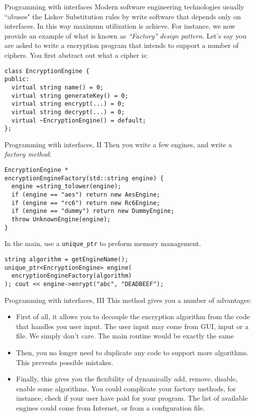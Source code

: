 \begin{frame}[fragile]{Programming with interfaces}
Modern software engineering technologies usually ``abuses" the Liskov Substitution rules by write software that depends only on interfaces. In this way maximum utilization is achieve. For instance, we now provide an example of what is known as \textit{``Factory" design pattern}. Let's say you are asked to write a encryption program that intends to support a number of ciphers. You first abstract out what a cipher is:

\begin{verbatim}
class EncryptionEngine {
public:
  virtual string name() = 0;
  virtual string generateKey() = 0;
  virtual string encrypt(...) = 0;
  virtual string decrypt(...) = 0;
  virtual ~EncryptionEngine() = default;
};
\end{verbatim}
\end{frame}

\begin{frame}[fragile]{Programming with interfaces, II}
Then you write a few engines, and write a \textit{factory method}:
\begin{verbatim}
EncryptionEngine *
encryptionEngineFactory(std::string engine) {
  engine =string_tolower(engine);
  if (engine == "aes") return new AesEngine;
  if (engine == "rc6") return new Rc6Engine;
  if (engine == "dummy") return new DummyEngine;
  throw UnknownEngine(engine);
}
\end{verbatim}

In the main,  use a \texttt{unique\_ptr} to preform memory management.

\begin{verbatim}
string algorithm = getEngineName();
unique_ptr<EncryptionEngine> engine(
  encryptionEngineFactory(algorithm)
); cout << engine->enrypt("abc", "DEADBEEF");
\end{verbatim}
\end{frame}

\begin{frame}[fragile]{Programming with interfaces, III}
\vspace{-0.1in}
This method gives you a number of advantages:
\begin{itemize}
	\item First of all, it allows you to decouple the encryption algorithm from the code that handles you user input. The user input may come from GUI, input or a file. We simply don't care. The main routine would be exactly the same
	\item Then, you no longer need to duplicate any code to support more algorithms. This prevents possible mistakes.
	\item Finally, this gives you the flexibility of dynamically add, remove, disable, enable some algorithms. You could complicate your factory methods, for instance, check if your user have paid for your program. The list of available engines could come from Internet, or from a configuration file. 
\end{itemize}
\end{frame}

